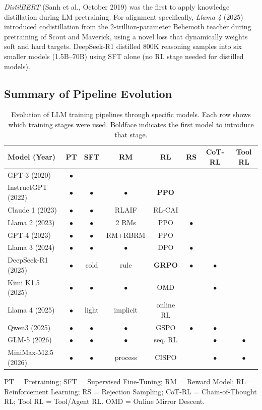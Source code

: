 \documentclass[12pt]{article}
\begin{document}
\textit{DistilBERT} (Sanh et al., October 2019) was the first to apply knowledge distillation during LM pretraining. For alignment specifically, \textit{Llama 4} (2025) introduced codistillation from the 2-trillion-parameter Behemoth teacher during pretraining of Scout and Maverick, using a novel loss that dynamically weights soft and hard targets. DeepSeek-R1 distilled 800K reasoning samples into six smaller models (1.5B--70B) using SFT alone (no RL stage needed for distilled models).

\subsection{Summary of Pipeline Evolution}

\begin{table}[h]
\centering
\small
\caption{Evolution of LLM training pipelines through specific models. Each row shows which training stages were used. Boldface indicates the first model to introduce that stage.}
\label{tab:pipeline_evolution}
\begin{tabular}{@{}p{2.8cm}ccccccc@{}}
\toprule
\textbf{Model (Year)} & \textbf{PT} & \textbf{SFT} & \textbf{RM} & \textbf{RL} & \textbf{RS} & \textbf{CoT-RL} & \textbf{Tool RL} \\
\midrule
GPT-3 (2020)           & $\bullet$ & & & & & & \\
InstructGPT (2022)     & $\bullet$ & $\bullet$ & $\bullet$ & \textbf{PPO} & & & \\
Claude 1 (2023)        & $\bullet$ & $\bullet$ & RLAIF & RL-CAI & & & \\
Llama 2 (2023)         & $\bullet$ & $\bullet$ & 2 RMs & PPO & $\bullet$ & & \\
GPT-4 (2023)           & $\bullet$ & $\bullet$ & RM+RBRM & PPO & & & \\
Llama 3 (2024)         & $\bullet$ & $\bullet$ & $\bullet$ & DPO & $\bullet$ & & \\
DeepSeek-R1 (2025)     & $\bullet$ & cold & rule & \textbf{GRPO} & $\bullet$ & $\bullet$ & \\
Kimi K1.5 (2025)       & $\bullet$ & $\bullet$ & $\bullet$ & OMD & & $\bullet$ & \\
Llama 4 (2025)         & $\bullet$ & light & implicit & online RL & & & \\
Qwen3 (2025)           & $\bullet$ & $\bullet$ & $\bullet$ & GSPO & $\bullet$ & $\bullet$ & \\
GLM-5 (2026)           & $\bullet$ & $\bullet$ & $\bullet$ & seq. RL & & $\bullet$ & $\bullet$ \\
MiniMax-M2.5 (2026)    & $\bullet$ & $\bullet$ & process & CISPO & & $\bullet$ & $\bullet$ \\
\bottomrule
\end{tabular}
\par\smallskip
\footnotesize PT = Pretraining; SFT = Supervised Fine-Tuning; RM = Reward Model; RL = Reinforcement Learning; RS = Rejection Sampling; CoT-RL = Chain-of-Thought RL; Tool RL = Tool/Agent RL. OMD = Online Mirror Descent.
\end{table}
\end{document}
